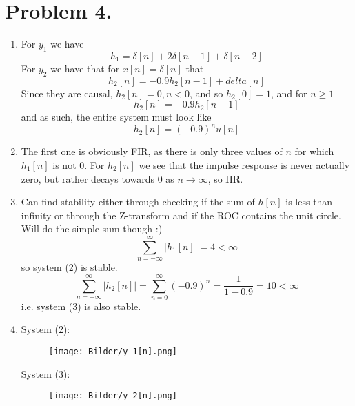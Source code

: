 \documentclass[a4paper,11pt,norsk]{article}
\begin{document}
\section*{Problem 4.}
\begin{enumerate}
    \item For $y_1$ we have 
        \[
            h_1 = \delta[n] + 2\delta[n - 1] + \delta[n - 2]
        \]
        For $y_2$ we have that for $x[n] = \delta[n]$ that
        \[
            h_2[n] = -0.9h_2[n-1] + delta[n]
        \]
        Since they are causal, $h_2[n] = 0, n < 0$, and so $h_2[0] = 1$, and for $n \geq 1$
        \[
            h_2[n] = -0.9h_2[n-1]
        \]
        and as such, the entire system must look like
        \[
            h_2[n] = (-0.9)^n u[n]
        \]
    \item The first one is obviously FIR, as there is only three values of $n$ for which $h_1[n]$ is not 0. For $h_2[n]$
        we see that the impulse response is never actually zero, but rather decays towards 0 as $n \to \infty$, so IIR.
    \item Can find stability either through checking if the sum of $h[n]$ is less than infinity or through the Z-transform and if the ROC contains the unit circle. Will do the simple 
        sum though :)
        \[
            \sum_{n=-\infty}^{\infty} |h_1[n]| = 4 < \infty
        \]
        so system (2) is stable. 
        \[
            \sum_{n=-\infty}^{\infty} |h_2[n]| = \sum_{n=0}^{\infty} (-0.9)^n = \frac{1}{1 - 0.9} = 10 < \infty
        \]
        i.e. system (3) is also stable.
    \item System (2):
        \begin{figure}[H]
            \center
            \texttt{[image: Bilder/y\_1[n].png]}
        \end{figure}
        System (3):
        \begin{figure}[H]
            \center
            \texttt{[image: Bilder/y\_2[n].png]}
        \end{figure}
\end{enumerate}
\end{document}
